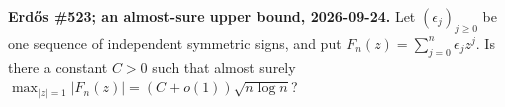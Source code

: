 \textbf{Erd\H{o}s \#523; an almost-sure upper bound, 2026-09-24.}
Let $(\epsilon_j)_{j\geq0}$ be one sequence of independent symmetric signs, and put
$F_n(z)=\sum_{j=0}^n\epsilon_jz^j$. Is there a constant $C>0$ such that almost surely
$\max_{|z|=1}|F_n(z)|=(C+o(1))\sqrt{n\log n}$?
